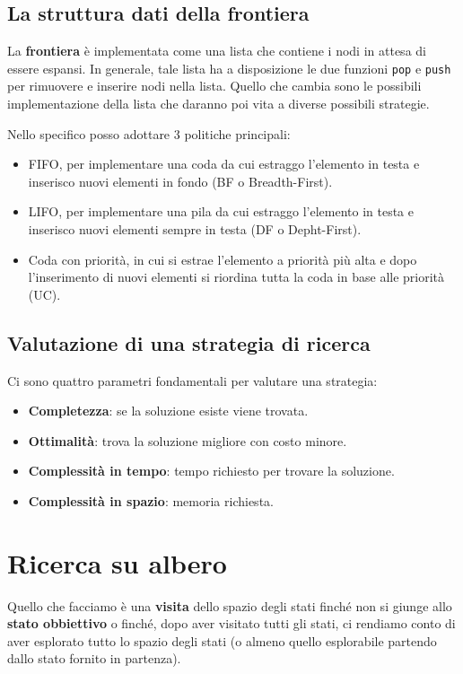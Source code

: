 \subsection{La struttura dati della frontiera}
La \textbf{frontiera} \`e implementata come una lista che contiene i nodi in attesa di essere
espansi. In generale, tale lista ha a disposizione le due funzioni \verb|pop| e \verb|push|
per rimuovere e inserire nodi nella lista. Quello che cambia sono le possibili implementazione
della lista che daranno poi vita a diverse possibili strategie.

Nello specifico posso adottare 3 politiche principali:
\begin{itemize}
	\item FIFO, per implementare una coda da cui estraggo l'elemento in testa e inserisco
	      nuovi elementi in fondo (BF o Breadth-First).
	\item LIFO, per implementare una pila da cui estraggo l'elemento in testa e inserisco nuovi
	      elementi sempre in testa (DF o Depht-First).
	\item Coda con priorit\`a, in cui si estrae l'elemento a priorit\`a pi\`u alta e dopo
	      l'inserimento di nuovi elementi si riordina tutta la coda in base alle priorit\`a
	      (UC).
\end{itemize}

\subsection{Valutazione di una strategia di ricerca}
Ci sono quattro parametri fondamentali per valutare una strategia:
\begin{itemize}
	\item \textbf{Completezza}: se la soluzione esiste viene trovata.
	\item \textbf{Ottimalit\`a}: trova la soluzione migliore con costo minore.
	\item \textbf{Complessit\`a in tempo}: tempo richiesto per trovare la soluzione.
	\item \textbf{Complessit\`a in spazio}: memoria richiesta.
\end{itemize}

\section{Ricerca su albero}
Quello che facciamo \`e una \textbf{visita} dello spazio degli stati finch\'e non
si giunge allo \textbf{stato obbiettivo} o finch\'e, dopo aver visitato tutti gli stati, ci
rendiamo conto di aver esplorato tutto lo spazio degli stati (o almeno quello esplorabile
partendo dallo stato fornito in partenza).

